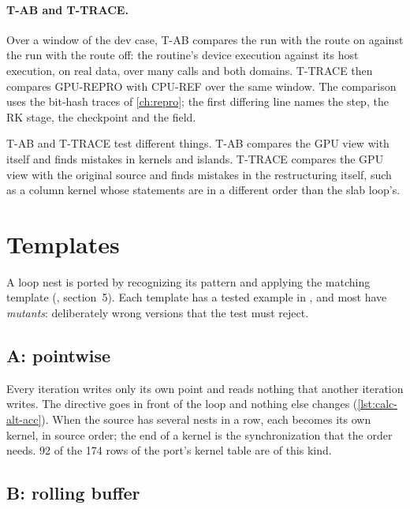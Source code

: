 \paragraph{T-AB and T-TRACE.} Over a window of the dev case, T-AB compares the run with the route on against the run
with the route off: the routine's device execution against its host execution, on real data, over many calls and
both domains. T-TRACE then compares GPU-REPRO with CPU-REF over the same window. The comparison uses the bit-hash
traces of \cref{ch:repro}; the first differing line names the step, the RK stage, the checkpoint and the field.

T-AB and T-TRACE test different things. T-AB compares the GPU view with itself and finds mistakes in kernels and
islands. T-TRACE compares the GPU view with the original source and finds mistakes in the restructuring itself, such
as a column kernel whose statements are in a different order than the slab loop's.

\section{Templates}

A loop nest is ported by recognizing its pattern and applying the matching template
(, section~5). Each template has a tested example in , and most
have \emph{mutants}: deliberately wrong versions that the test must reject.

\subsection{A: pointwise}

Every iteration writes only its own point and reads nothing that another iteration writes. The directive goes in
front of the loop and nothing else changes (\cref{lst:calc-alt-acc}). When the source has several nests in a row, each
becomes its own kernel, in source order; the end of a kernel is the synchronization that the order needs. 92 of the
174 rows of the port's kernel table are of this kind.

\subsection{B: rolling buffer}

